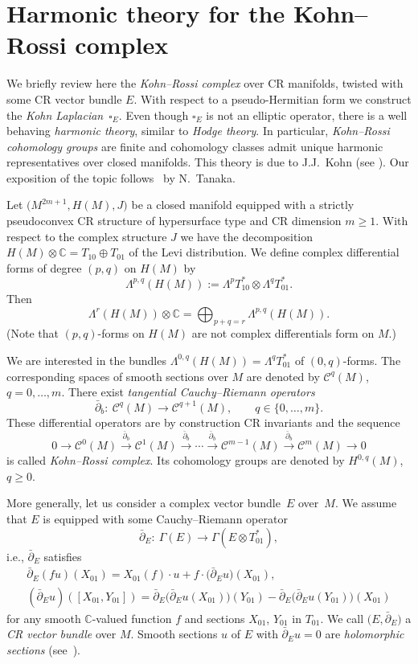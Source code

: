 \documentclass[pdftex]{sigma}
\numberwithin{equation}{section}
\newcommand{\CC}{\mathbb{C}}
\begin{document}
\section{Harmonic theory for the Kohn--Rossi complex} \label{Sec9}

We briefly review here the {\em Kohn--Rossi complex} \cite{KR} over
CR manifolds, twisted with some CR vector bundle $E$.
With respect to a pseudo-Hermitian form we construct the {\em Kohn Laplacian}~$\square_E$. Even though
$\square_E$ is not an elliptic operator,
there is a well behaving {\em harmonic theory}, similar to {\em Hodge theory}.
In particular, {\em Kohn--Rossi cohomology groups} are finite
and cohomology classes admit unique harmonic representatives over closed manifolds. This theory is due to J.J.~Kohn (see \cite{FK, Koh}). Our exposition of the topic follows~\cite{Tan} by N.~Tanaka.

Let $\big(M^{2m+1}, H(M), J\big)$ be a closed manifold equipped with a strictly pseudoconvex CR structure of hypersurface type and CR dimension $m\geq 1$.
With respect to the complex structure $J$ we have the decomposition $H(M)\otimes \CC=T_{10}\oplus T_{01}$
of the Levi distribution.
We define complex differential forms of degree $(p,q)$ on $H(M)$ by
\[
\Lambda^{p,q}(H(M)) := \Lambda^p T_{10}^* \otimes \Lambda^q T_{01}^*.
\]
Then
\[
\Lambda^r(H(M))\otimes\CC = \bigoplus_{p+q=r} \Lambda^{p,q}(H(M)).
\]
(Note that $(p,q)$-forms on $H(M)$ are not complex differentials form on $M$.)

We are interested in the bundles $\Lambda^{0,q}(H(M))=\Lambda^q T_{01}^*$ of $(0,q)$-forms.
The corresponding spaces of smooth sections over $M$ are denoted by $\mathcal{C}^q(M)$, $q=0,\dots, m$.
There exist {\em tangential Cauchy--Riemann operators}
\[
\bar{\partial}_b\colon \ \mathcal{C}^q(M) \to \mathcal{C}^{q+1}(M),\qquad q\in\{0,\dots,m\}.
\]
These differential operators are by construction CR invariants and
the sequence
\[
0\longrightarrow \mathcal{C}^0(M) \stackrel{\bar{\partial}_b}{\longrightarrow} \mathcal{C}^1(M) \stackrel{\bar{\partial}_b}{\longrightarrow} \cdots
 \stackrel{\bar{\partial}_b}{\longrightarrow} \mathcal{C}^{m-1}(M) \stackrel{\bar{\partial}_b}{\longrightarrow} \mathcal{C}^m(M)\longrightarrow 0
\]
is called {\em Kohn--Rossi complex}. Its cohomology groups are denoted by $H^{0,q}(M)$, $q\geq 0$.

More generally, let us consider a complex vector bundle~$E$ over~$M$. We assume that $E$ is equipped with some Cauchy--Riemann operator
\[ \bar{\partial}_E\colon \ \Gamma(E) \to \Gamma(E\otimes T_{01}^*),\]
i.e., $\bar{\partial}_E$ satisfies
\begin{gather*} \bar{\partial}_E(fu)(X_{01})=X_{01}(f)\cdot u+ f\cdot \big(\bar{\partial}_Eu\big)(X_{01}),\\
(\bar{\partial}_Eu)([X_{01},Y_{01}])=\bar{\partial}_E\big(\bar{\partial}_Eu(X_{01})\big)(Y_{01})- \bar{\partial}_E\big(\bar{\partial}_Eu(Y_{01})\big)(X_{01})
\end{gather*}
for any smooth $\CC$-valued function $f$ and sections $X_{01}$, $Y_{01}$ in $T_{01}$. We call $\big(E,\bar{\partial}_E\big)$ a {\em CR vector bundle} over $M$. Smooth sections $u$ of $E$ with $\bar{\partial}_Eu=0$ are {\em holomorphic sections} (see~\cite{Tan}).
\end{document}
